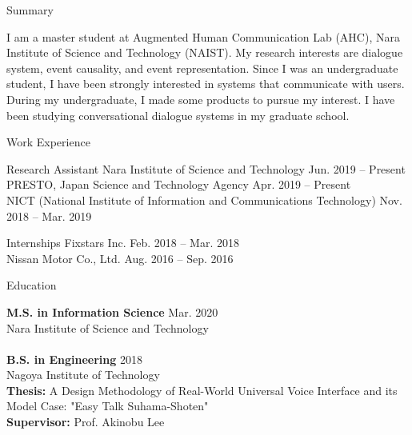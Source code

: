 \documentclass{resume} %
\begin{document}

\begin{rSection}{Summary}

I am a master student at Augmented Human Communication Lab (AHC), Nara Institute of Science and Technology (NAIST).
My research interests are dialogue system, event causality, and event representation.
Since I was an undergraduate student, I have been strongly interested in systems that communicate with users.
During my undergraduate, I made some products to pursue my interest.
I have been studying conversational dialogue systems in my graduate school.

\end{rSection}


\begin{rSection}{Work Experience}

\begin{rSubsection}{Research Assistant}{}{}{}
Nara Institute of Science and Technology \hfill Jun. 2019 -- Present
\\PRESTO, Japan Science and Technology Agency \hfill Apr. 2019 -- Present
\\NICT (National Institute of Information and Communications Technology) \hfill Nov. 2018 -- Mar. 2019
\end{rSubsection}

\begin{rSubsection}{Internships}{}{}{}
Fixstars Inc. \hfill Feb. 2018 -- Mar. 2018
\\Nissan Motor Co., Ltd. \hfill Aug. 2016 -- Sep. 2016
\end{rSubsection}

\end{rSection}


\begin{rSection}{Education}

{\bf M.S. in Information Science} \hfill Mar. 2020 
\\ Nara Institute of Science and Technology
\\
\\{\bf B.S. in Engineering} \hfill 2018 
\\ Nagoya Institute of Technology
\\ {\bf Thesis:} A Design Methodology of Real-World Universal Voice Interface and its Model Case: "Easy Talk Suhama-Shoten"
\\ {\bf Supervisor:} Prof. Akinobu Lee

\end{rSection}
\end{document}
